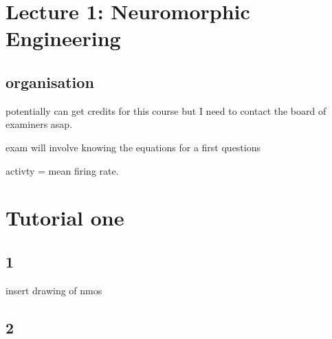 \documentclass{article}
\begin{document}
\section{Lecture 1: Neuromorphic Engineering}
\subsection{organisation}

potentially can get credits for this course but I need to contact the board of examiners asap.









exam will involve knowing the equations for a first questions


activty = mean firing rate.








\section{Tutorial one}
\subsection{1}

insert drawing of nmos
\subsection{2}
\end{document}
